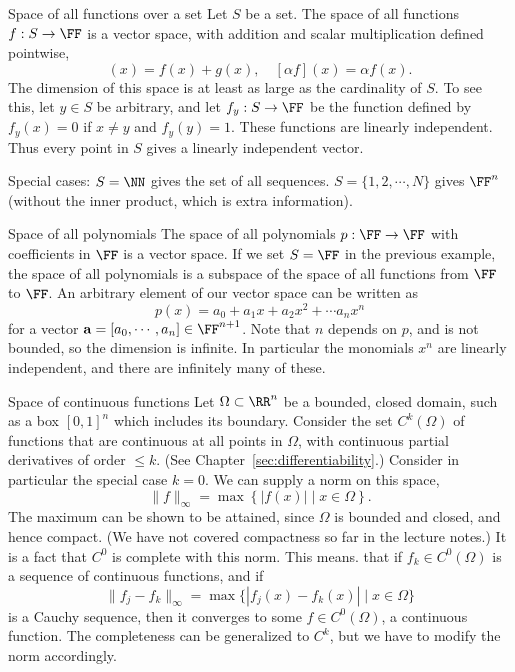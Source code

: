 \begin{myExample}{Space of all functions over a set}{}
    Let $S$ be a set. The space of all functions $f : S \to \FF$ is a vector space, with addition and scalar multiplication defined pointwise,
    \begin{equation}
        [f + g](x) = f(x) + g(x), \quad [\alpha f](x) = \alpha f(x).
    \end{equation}
    The dimension of this space is at least as large as the cardinality of $S$. To see this, let $y \in S$ be arbitrary, and let $f_y : S \to \FF$ be the function defined by $f_y(x) = 0$ if $x\neq y$ and $f_y(y)=1$. These functions are linearly independent. Thus every point in $S$ gives a linearly independent vector.
    
    Special cases: $S = \NN$ gives the set of all sequences. $S = \{1,2,\cdots,N\}$ gives $\FF^n$ (without the inner product, which is extra information).
\end{myExample}

\begin{myExample}{Space of all polynomials}{}
    The space of all polynomials $p : \FF\to\FF$ with coefficients in $\FF$ is a vector space. If we set $S = \FF$ in the previous example, the space of all polynomials is a subspace of the space of all functions from $\FF$ to $\FF$. An arbitrary element of our vector space can be written as
    \[ p(x) = a_0 + a_1 x + a_2 x^2 + \cdots a_n x^n \]
    for a vector $\mathbf{a} = [a_0, \cdots, a_n] \in \FF^{n+1}$. Note that $n$ depends on $p$, and is not bounded, so the dimension is infinite. In particular the monomials $x^n$ are linearly independent, and there are infinitely many of these. 
\end{myExample}

\begin{myExample}{Space of continuous functions}{}
Let $\Omega \subset \RR^n$ be a bounded, closed domain, such as a box $[0,1]^n$ which includes its boundary. Consider  the set $C^k(\Omega)$ of functions that are continuous at all points in $\Omega$, with continuous partial derivatives of order $\leq k$. (See Chapter~\ref{sec:differentiability}.) Consider in particular the special case $k=0$. We can supply a norm on this space,
\begin{equation}
\|f\|_\infty = \max \left\{ |f(x)| \mid x \in \Omega \right\}.
\end{equation}
The maximum can be shown to be attained, since $\Omega$ is bounded and closed, and hence compact. (We have not covered compactness so far in the lecture notes.) It is a fact that $C^0$ is complete with this norm. This means. that if $f_k \in C^0(\Omega)$ is a sequence of continuous functions, and if
\begin{equation}
    \|f_j - f_k\|_\infty =\max\{ |f_j(x)-f_k(x)| \mid x \in \Omega \}
\end{equation}
is a Cauchy sequence, then it converges to some $f\in C^0(\Omega)$, a continuous function. The completeness can be generalized to $C^k$, but we have to modify the norm accordingly.
\end{myExample}

